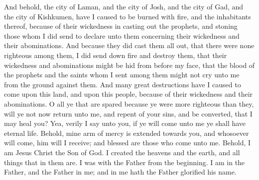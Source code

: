 And behold, the city of Laman, and the city of Josh, and the city of Gad, and the city of Kishkumen, have I caused to be burned with fire, and the inhabitants thereof, because of their wickedness in casting out the prophets, and stoning those whom I did send to declare unto them concerning their wickedness and their abominations.
\bverse \iffalse And because they did cast them all out, that there were none righteous among them, I did send down fire and destroy them, that their wickedness and abominations might be hid from before my face, that the blood of the prophets and the saints whom I sent among them might not cry unto me from the ground against them. \fi
And because they did cast them all out, that there were none righteous among them, I did send down fire and destroy them, that their wickedness and abominations might be hid from before my face, that the blood of the prophets and the saints whom I sent among them might not cry unto me from the ground against them.
\bverse \iffalse And many great destructions have I caused to come upon this land, and upon this people, because of their wickedness and their abominations. \fi
And many great destructions have I caused to come upon this land, and upon this people, because of their wickedness and their abominations.
\bverse \iffalse O all ye that are spared because ye were more righteous than they, will ye not now return unto me, and repent of your sins, and be converted, that I may heal you? \fi
O all ye that are spared because ye were more righteous than they, will ye not now return unto me, and repent of your sins, and be converted, that I may heal you?
\bverse \iffalse Yea, verily I say unto you, if ye will come unto me ye shall have eternal life. Behold, mine arm of mercy is extended towards you, and whosoever will come, him will I receive; and blessed are those who come unto me. \fi
Yea, verily I say unto you, if ye will come unto me ye shall have eternal life. Behold, mine arm of mercy is extended towards you, and whosoever will come, him will I receive; and blessed are those who come unto me.
\bverse \iffalse Behold, I am Jesus Christ the Son of God. I created the heavens and the earth, and all things that in them are. I was with the Father from the beginning. I am in the Father, and the Father in me; and in me hath the Father glorified his name. \fi
Behold, I am Jesus Christ the Son of God. I created the heavens and the earth, and all things that in them are. I was with the Father from the beginning. I am in the Father, and the Father in me; and in me hath the Father glorified his name.
